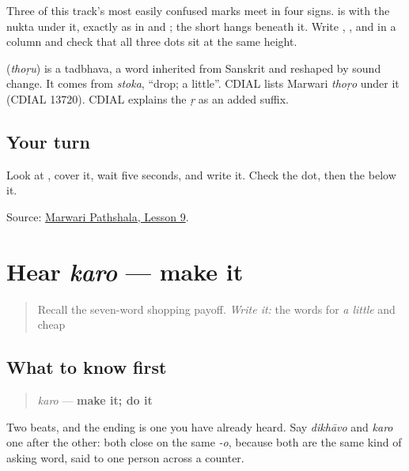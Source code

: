 Three of this track's most easily confused marks meet in four signs. \textbf{} is \textbf{} with the nukta under it, exactly as in \textbf{} and \textbf{}; the short \textbf{} hangs beneath it. Write \textbf{}, \textbf{}, and \textbf{} in a column and check that all three dots sit at the same height.

\begin{cousinweb}
\textbf{} (\emph{thoṛu}) is a tadbhava, a word inherited from Sanskrit and reshaped by sound change. It comes from \emph{stoka}, \textquotedblleft{}drop; a little\textquotedblright{}. CDIAL lists Marwari \emph{thoṛo} under it (CDIAL 13720). CDIAL explains the \emph{ṛ} as an added suffix.
\end{cousinweb}

\subsection*{Your turn}
Look at \textbf{}, cover it, wait five seconds, and write it. Check the dot, then the \textbf{} below it.

\begin{tcolorbox}[breakable,colback=teal!4,colframe=teal!35!black,title={Before you move on}]
Source: \href{https://www.marwaripathshala.com/marwari-lesson-9-english}{Marwari Pathshala, Lesson 9}.
\end{tcolorbox}
\section[karo]{Hear \emph{karo} — make it}

\label{lesson:MW-C23-hear-karo}



\begin{quote}
Recall the seven-word shopping payoff. \emph{Write it:} the words for \emph{a little} and cheap
\end{quote}

\subsection*{What to know first}
\begin{quote}
\emph{karo} — \textbf{make it; do it}
\end{quote}

Two beats, and the ending is one you have already heard. Say \emph{dikhāvo} and \emph{karo} one after the other: both close on the same \emph{-o}, because both are the same kind of asking word, said to one person across a counter.

